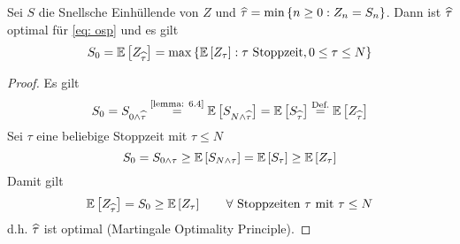 \begin{theorem} %
	\label{theorem: 6.5}
	Sei $S$ die Snellsche Einhüllende von $Z$ und $\widehat{\tau} = \min\left\{ n \ge 0 : Z_n = S_n \right\}$. Dann ist $\widehat{\tau}$ optimal für \eqref{eq: osp} und es gilt
	\begin{equation*}
		S_0 = \mathbb{E} \left[ Z_{\widehat{\tau}} \right] = \max\left\{ \mathbb{E} \left[ Z_\tau \right] : \tau \text{ Stoppzeit}, 0 \le \tau \le N \right\}
	\end{equation*}
\end{theorem}
\begin{proof}
	Es gilt
	\begin{equation*}
		S_0 = S_{0 \land \dach{\tau}} \overset{\text{\cref{lemma: 6.4}}}{=} \EW[S_{N \land \dach{\tau}}] = \EW[S_{\dach{\tau}}] \overset{\text{Def.}}{=} \EW[Z_{\dach{\tau}}]
	\end{equation*}
	Sei $\tau$ eine beliebige Stoppzeit  mit $\tau \le N$
	\begin{equation*}
		S_0 = S_{0 \land \tau} \ge \mathbb{E} \left[ S_{N \land \tau} \right] = \mathbb{E} \left[ S_\tau \right] \ge \mathbb{E} \left[ Z_\tau \right]
	\end{equation*}
	Damit gilt
	\begin{equation*}
		\mathbb{E} \left[ Z_{\widehat{\tau}} \right] = S_0 \ge \mathbb{E} \left[ Z_\tau \right] \qquad \forall \text{ Stoppzeiten } \tau \text{ mit } \tau \le N
	\end{equation*}
	d.h. $\widehat{\tau}$ ist optimal (Martingale Optimality Principle).
\end{proof}

